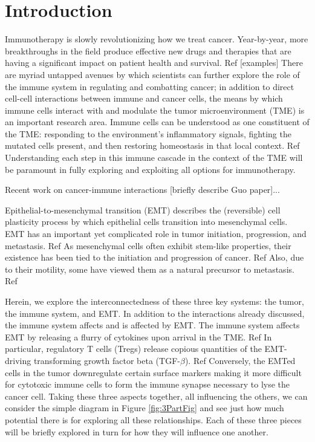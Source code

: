 \documentclass{article}
\begin{document}
\section{Introduction}
Immunotherapy is slowly revolutionizing how we treat cancer.
Year-by-year, more breakthroughs in the field produce effective new drugs and therapies that are having a significant impact on patient health and survival. Ref  [examples] 
There are myriad untapped avenues by which scientists can further explore the role of the immune system in regulating and combatting cancer; in addition to direct cell-cell interactions between immune and cancer cells, the means by which immune cells interact with and modulate the tumor microenvironment (TME) is an important research area. Immune cells can be understood as one constituent of the TME: responding to the environment's inflammatory signals, fighting the mutated cells present, and then restoring homeostasis in that local context. Ref 
Understanding each step in this immune cascade in the context of the TME will be paramount in fully exploring and exploiting all options for immunotherapy.

Recent work on cancer-immune interactions [briefly describe Guo paper]...

Epithelial-to-mesenchymal transition (EMT) describes the (reversible) cell plasticity process by which epithelial cells transition into mesenchymal cells. EMT has an important yet complicated role in tumor initiation, progression, and metastasis. Ref 
As mesenchymal cells often exhibit stem-like properties, their existence has been tied to the initiation and progression of cancer. Ref
Also, due to their motility, some have viewed them as a natural precursor to metastasis. Ref 

Herein, we explore the interconnectedness of these three key systems: the tumor, the immune system, and EMT.
In addition to the interactions already discussed, the immune system affects and is affected by EMT.
The immune system affects EMT by releasing a flurry of cytokines upon arrival in the TME. Ref 
In particular, regulatory T cells (Tregs) release copious quantities of the EMT-driving transforming growth factor beta (TGF-$\beta$). Ref 
Conversely, the EMTed cells in the tumor downregulate certain surface markers making it more difficult for cytotoxic immune cells to form the immune synapse necessary to lyse the cancer cell.
Taking these three aspects together, all influencing the others, we can consider the simple diagram in Figure \ref{fig:3PartFig} and see just how much potential there is for exploring all these relationships.
Each of these three pieces will be briefly explored in turn for how they will influence one another.
\end{document}
